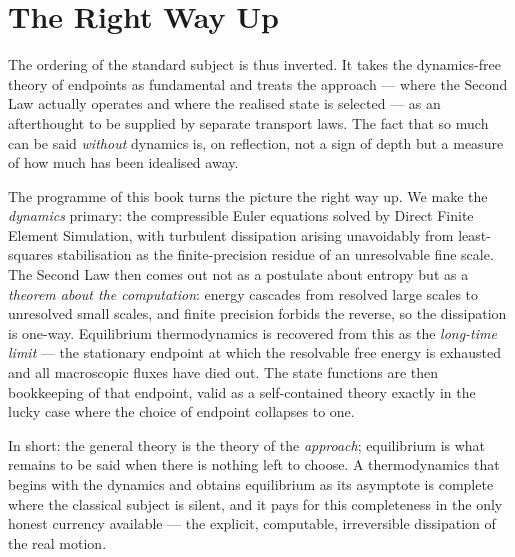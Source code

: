 \section{The Right Way Up}

The ordering of the standard subject is thus inverted. It takes the dynamics-free
theory of endpoints as fundamental and treats the approach --- where the Second Law
actually operates and where the realised state is selected --- as an afterthought to
be supplied by separate transport laws. The fact that so much can be said
\emph{without} dynamics is, on reflection, not a sign of depth but a measure of how
much has been idealised away.

The programme of this book turns the picture the right way up. We make the
\emph{dynamics} primary: the compressible Euler equations solved by Direct Finite
Element Simulation, with turbulent dissipation arising unavoidably from
least-squares stabilisation as the finite-precision residue of an unresolvable fine
scale. The Second Law then comes out not as a postulate about entropy but as a
\emph{theorem about the computation}: energy cascades from resolved large scales to
unresolved small scales, and finite precision forbids the reverse, so the
dissipation is one-way. Equilibrium thermodynamics is recovered from this as the
\emph{long-time limit} --- the stationary endpoint at which the resolvable free
energy is exhausted and all macroscopic fluxes have died out. The state functions
are then bookkeeping of that endpoint, valid as a self-contained theory exactly in
the lucky case where the choice of endpoint collapses to one.

In short: the general theory is the theory of the \emph{approach}; equilibrium is
what remains to be said when there is nothing left to choose. A thermodynamics that
begins with the dynamics and obtains equilibrium as its asymptote is complete where
the classical subject is silent, and it pays for this completeness in the only
honest currency available --- the explicit, computable, irreversible dissipation of
the real motion.
